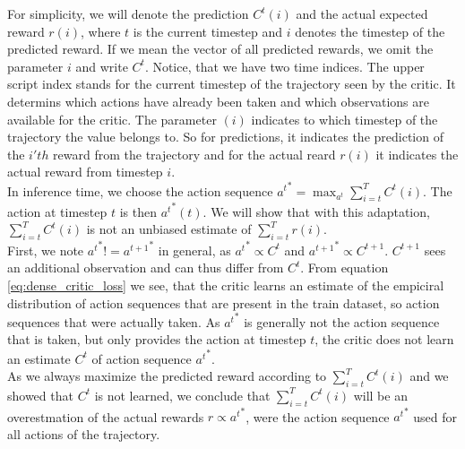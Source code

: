 For simplicity, we will denote the prediction 
$C^t(i)$ and the actual expected reward $r(i)$, where $t$ is the current timestep and $i$ denotes the timestep of the predicted reward. If we mean the vector of all predicted rewards, we omit the 
parameter $i$ and write $C^t$. Notice, that we have two time indices. The upper script index stands for the current timestep of the trajectory seen by the critic. 
It determins which actions have already been taken and 
which observations are available for the critic. The parameter $(i)$ indicates to which timestep of the trajectory the value belongs to. So for predictions, it indicates the prediction of the $i'th$ 
reward from the trajectory and for the actual reard $r(i)$ it indicates the actual reward from timestep $i$.\\ 
In inference time, we choose the action sequence 
${a^t}^* = \max_{a^t} \sum_{i=t}^T C^t(i)$. The action at timestep $t$ is then ${a^t}^*(t)$. We will show that with this adaptation, $\sum_{i=t}^T C^t(i)$ is not an unbiased estimate of 
$\sum_{i=t}^T r(i)$.\\
First, we note ${a^t}^* != {a^{t+1}}^*$ in general, as ${a^t}^* \propto C^t$ and ${a^{t+1}}^* \propto C^{t+1}$. $C^{t+1}$ sees an additional observation and can thus differ from $C^{t}$. 
From equation \ref{eq:dense_critic_loss} we see, that the critic learns an estimate of the empiciral distribution of action sequences that are present in the train dataset, so action sequences that 
were actually taken. As ${a^t}^*$ is generally not the action sequence that is taken, but only provides the action at timestep $t$, the critic does not learn an estimate $C^t$ of action sequence 
${a^t}^*$. \\
As we always maximize the predicted reward according to $\sum_{i=t}^T C^t(i)$ and we showed that $C^t$ is not learned, we conclude that $\sum_{i=t}^T C^t(i)$ 
will be an overestmation of the actual rewards $r \propto {a^t}^*$, were the action sequence ${a^t}^*$ used for all actions of the trajectory. \\

